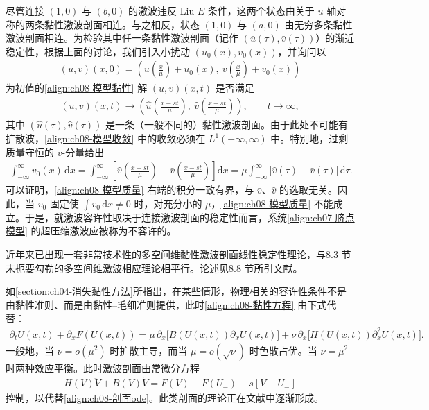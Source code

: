 \documentclass[../../main.tex]{subfiles}
\begin{document}
尽管连接 $(1,0)$ 与 $(b,0)$ 的激波违反 Liu $E$-条件，这两个状态由关于 $u$ 轴对称的两条黏性激波剖面相连。与之相反，状态 $(1,0)$ 与 $(a,0)$ 由无穷多条黏性激波剖面相连。为检验其中任一条黏性激波剖面（记作 $(\bar u(\tau),\bar v(\tau))$）的渐近稳定性，根据上面的讨论，我们引入小扰动 $(u_0(x),v_0(x))$，并询问以
\begin{align}
(u,v)(x,0)=\left(\bar u\!\left(\frac{x}{\mu}\right)+u_0(x),\ \bar v\!\left(\frac{x}{\mu}\right)+v_0(x)\right)
\label{align:ch08-模型初值}
\end{align}
为初值的\eqref{align:ch08-模型黏性} 解 $(u,v)(x,t)$ 是否满足
\begin{align}
(u,v)(x,t)\to\left(\hat u\!\left(\frac{x-st}{\mu}\right),\ \hat v\!\left(\frac{x-st}{\mu}\right)\right),\qquad t\to\infty,
\label{align:ch08-模型收敛}
\end{align}
其中 $(\hat u(\tau),\hat v(\tau))$ 是一条（一般不同的）黏性激波剖面。由于此处不可能有扩散波，\eqref{align:ch08-模型收敛} 中的收敛必须在 $L^1(-\infty,\infty)$ 中。特别地，过剩质量守恒的 $v$-分量给出
\begin{align}
\int_{-\infty}^{\infty}v_0(x)\,\mathrm{d}x
=\int_{-\infty}^{\infty}\left[\hat v\!\left(\frac{x-st}{\mu}\right)-\bar v\!\left(\frac{x-st}{\mu}\right)\right]\mathrm{d}x
=\mu\int_{-\infty}^{\infty}\big[\hat v(\tau)-\bar v(\tau)\big]\,\mathrm{d}\tau.
\label{align:ch08-模型质量}
\end{align}
可以证明，\eqref{align:ch08-模型质量} 右端的积分一致有界，与 $\bar v$、$\hat v$ 的选取无关。因此，当 $v_0$ 固定使 $\int v_0\,\mathrm{d}x\neq0$ 时，对充分小的 $\mu$，\eqref{align:ch08-模型质量} 不能成立。于是，就激波容许性取决于连接激波剖面的稳定性而言，系统\eqref{align:ch07-脐点模型} 的超压缩激波应被称为不容许的。

近年来已出现一套非常技术性的多空间维黏性激波剖面线性稳定性理论，与\hyperref[section:ch08-lax容许性准则]{8.3 节}末扼要勾勒的多空间维激波相应理论相平行。论述见\hyperref[section:ch08-注记]{8.8 节}所引文献。

如\cref{section:ch04-消失黏性方法}所指出，在某些情形，物理相关的容许性条件不是由黏性准则、而是由黏性--毛细准则提供，此时\eqref{align:ch08-黏性方程} 由下式代替：
\begin{align}
\partial_t U(x,t)+\partial_x F(U(x,t))
=\mu\,\partial_x\big[B(U(x,t))\partial_x U(x,t)\big]
+\nu\,\partial_x\big[H(U(x,t))\partial_x^2 U(x,t)\big].
\label{align:ch08-黏性毛细}
\end{align}
一般地，当 $\nu=o(\mu^2)$ 时扩散主导，而当 $\mu=o(\sqrt\nu)$ 时色散占优。当 $\nu=\mu^2$ 时两种效应平衡。此时激波剖面由常微分方程
\begin{align}
H(V)\ddot V+B(V)\dot V=F(V)-F(U_-)-s[V-U_-]
\label{align:ch08-毛细剖面}
\end{align}
控制，以代替\eqref{align:ch08-剖面ode}。此类剖面的理论正在文献中逐渐形成。
\end{document}
